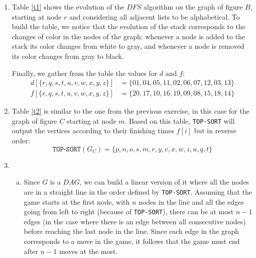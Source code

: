 \documentclass{article}
\begin{document}
\begin{enumerate}[1.]
    \item Table \ref{t1} shows the evolution of the $DFS$ algorithm on the graph of figure $B$, starting at node $r$ and considering all adjacent lists to be alphabetical. To build the table, we notice that the evolution of the stack corresponds to the changes of color in the nodes of the graph: whenever a node is added to the stack its color changes from white to gray, and whenever a node is removed its color changes from gray to black. 
    
    Finally, we gather from the table the values for $d$ and $f$:
    \begin{align*}
        d[\{r,q,s,t,u,v,w,x,y,z\}] &= \{01,04,05,11,02,06,07,12,03,13\} \\
        f[\{r,q,s,t,u,v,w,x,y,z\}] &= \{20,17,10,16,19,09,08,15,18,14\}
    \end{align*}

    \item Table \ref{t2} is similar to the one from the previous exercise, in this case for the graph of figure $C$ starting at node $m$. Based on this table, \texttt{TOP-SORT} will output the vertices according to their finishing times $f[i]$ but in reverse order:
    \begin{equation*}
        \texttt{TOP-SORT}(G_C) = \{p,n,o,s,m,r,y,v,x,w,z,u,q,t\}
    \end{equation*}
    
    \item
    \begin{enumerate}[(a)]
        \item Since $G$ is a $DAG$, we can build a linear version of it where all the nodes are in a straight line in the order defined by \texttt{TOP-SORT}. Assuming that the game starts at the first node, with $n$ nodes in the line and all the edges going from left to right (because of \texttt{TOP-SORT}), there can be at most $n-1$ edges (in the case where there is an edge between all consecutive nodes) before reaching the last node in the line. Since each edge in the graph corresponds to a move in the game, it follows that the game must end after $n-1$ moves at the most.
        

\end{enumerate}
\end{enumerate}
\end{document}
